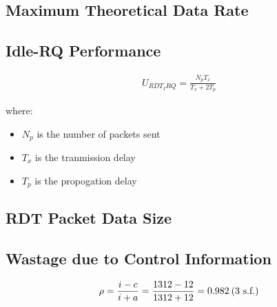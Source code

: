 \subsection{Maximum Theoretical Data Rate}



\subsection{Idle-RQ Performance}

\begin{align*}
    U_{RDT_IRQ} = \frac{N_pT_x}{T_x + 2T_p}
\end{align*}

where:
\begin{itemize}
    \item $N_p$ is the number of packets sent
    \item $T_x$ is the tranmission delay
    \item $T_p$ is the propogation delay
\end{itemize}

\subsection{RDT Packet Data Size}


\subsection{Wastage due to Control Information}

\begin{align*}
    \rho = \frac{i - c}{i + a} = \frac{1312 - 12}{1312 + 12} = 0.982 \text{\:(3 s.f.)}
\end{align*}